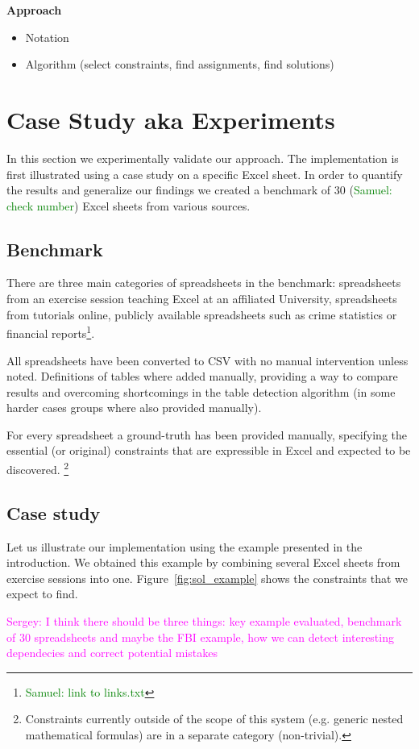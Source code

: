 \documentclass{ecai}
\newcommand{\sergey}[1]{\textcolor{magenta}{{\sc Sergey:} #1}\xspace}
\newcommand{\samuel}[1]{\textcolor{green}{{\sc Samuel:} #1}\xspace}
\begin{document}
\textbf{Approach}
\begin{itemize}
  \item Notation
  \item Algorithm (select constraints, find assignments, find solutions)
\end{itemize}


\section{Case Study aka Experiments}
In this section we experimentally validate our approach.
The implementation is first illustrated using a case study on a specific Excel sheet.
In order to quantify the results and generalize our findings we created a benchmark of 30 (\samuel{check number}) Excel sheets from various sources.

\subsection{Benchmark}
There are three main categories of spreadsheets in the benchmark: spreadsheets from an exercise session teaching Excel at an affiliated University, spreadsheets from tutorials online, publicly available spreadsheets such as crime statistics or financial reports\footnote{\samuel{link to links.txt}}.

All spreadsheets have been converted to CSV with no manual intervention unless noted.
Definitions of tables where added manually, providing a way to compare results and overcoming shortcomings in the table detection algorithm (in some harder cases groups where also provided manually).

For every spreadsheet a ground-truth has been provided manually, specifying the essential (or original) constraints that are expressible in Excel and expected to be discovered.
\footnote{Constraints currently outside of the scope of this system (e.g. generic nested mathematical formulas) are in a separate category (non-trivial).}

\subsection{Case study}
Let us illustrate our implementation using the example presented in the introduction.
We obtained this example by combining several Excel sheets from exercise sessions into one.
Figure~\ref{fig:sol_example} shows the constraints that we expect to find.

\sergey{I think there should be three things: key example evaluated, benchmark of 30 spreadsheets and maybe the FBI example, how we can detect interesting dependecies and correct potential mistakes}
\end{document}
